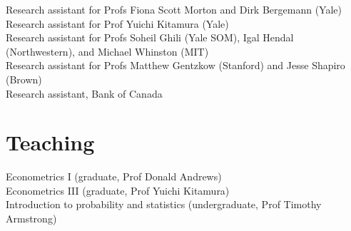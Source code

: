 \documentclass[11pt]{article} %
\begin{document}
 Research assistant for Profs Fiona Scott Morton and 
	Dirk Bergemann (Yale) \\

 Research assistant for Prof Yuichi Kitamura (Yale) \\
 Research assistant for Profs Soheil Ghili (Yale SOM), Igal Hendal (Northwestern), and Michael Whinston (MIT) \\
  Research assistant for Profs Matthew Gentzkow (Stanford) and Jesse Shapiro (Brown) \\
 Research assistant, Bank of Canada \\

\section*{Teaching}

 Econometrics I (graduate, Prof Donald Andrews) \\
 Econometrics III (graduate, Prof Yuichi Kitamura) \\
 Introduction to probability and statistics (undergraduate, Prof Timothy Armstrong)




\vfill %
\end{document}
